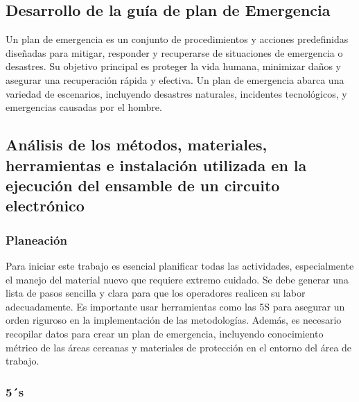 \subsection{Desarrollo de la guía de plan de Emergencia}

Un plan de emergencia es un conjunto de procedimientos y acciones predefinidas diseñadas para mitigar, responder y recuperarse de situaciones de emergencia o desastres.\cite{Plan}
\newline
Su objetivo principal es proteger la vida humana, minimizar daños y asegurar una recuperación rápida y efectiva. Un plan de emergencia abarca una variedad de escenarios, incluyendo desastres naturales, incidentes tecnológicos, y emergencias causadas por el hombre.
%
%
\subsection{Análisis de los métodos, materiales, herramientas e instalación utilizada en la ejecución del ensamble de un circuito electrónico}


\subsubsection{Planeación}

%
%
Para iniciar este trabajo es esencial planificar todas las actividades, especialmente el manejo del material nuevo que requiere extremo cuidado. Se debe generar una lista de pasos sencilla y clara para que los operadores realicen su labor adecuadamente. Es importante usar herramientas como las 5S para asegurar un orden riguroso en la implementación de las metodologías. Además, es necesario recopilar datos para crear un plan de emergencia, incluyendo conocimiento métrico de las áreas cercanas y materiales de protección en el entorno del área de trabajo.
    
\subsubsection{5´s}

